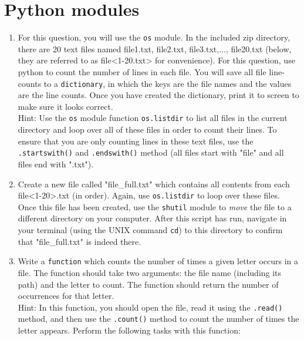 \documentclass{article}[12pt]
\newcommand{\code}[1]{\texttt{#1}}  %
\begin{document}
\section{Python modules}
\begin{enumerate}
	
	\item For this question, you will use the \code{os} module. In the included zip directory, there are 20 text files named file1.txt, file2.txt, file3.txt,..., file20.txt (below, they are referred to as file<1-20.txt> for convenience). For this question, use python to count the number of lines in each file. You will save all file line-counts to a \code{dictionary}, in which the keys are the file names and the values are the line counts. Once you have created the dictionary, print it to screen to make sure it looks correct.
	\\ Hint: Use the \code{os} module function \code{os.listdir} to list all files in the current directory and loop over all of these files in order to count their lines. To ensure that you are only counting lines in these text files, use the \code{.startswith()} and \code{.endswith()} method (all files start with "file" and all files end with ".txt").

	\item Create a new file called "file\_full.txt" which contains all contents from each file<1-20>.txt (in order). Again, use \code{os.listdir} to loop over these files. Once this file has been created, use the \code{shutil} module to \emph{move} the file to a different directory on your computer. After this script has run, navigate in your terminal (using the UNIX command \code{cd}) to this directory to confirm that "file\_full.txt" is indeed there.

	\item  Write a \code{function} which counts the number of times a given letter occurs in a file. The function should take two arguments: the file name (including its path) and the letter to count. The function should return the number of occurrences for that letter. \\Hint: In this function, you should open the file, read it using the \code{.read()} method, and then use the \code{.count()} method to count the number of times the letter appears. Perform the following tasks with this function:
	

\end{enumerate}
\end{document}
